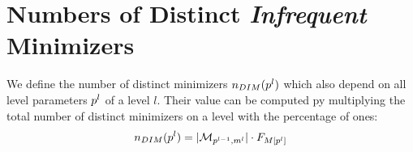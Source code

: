 \documentclass[a4paper,titlepage,onecolumn,oneside,12pt,nenglish,titlepage=firstiscover]{scrbook}
\theoremstyle{plain} %
\theoremstyle{definition} %
\theoremstyle{remark} %
\theoremstyle{plain}
\newcommand{\level}{l}
\begin{document}
\section{Numbers of Distinct \textit{Infrequent} Minimizers} \label{sec:nDIM}
\newcommand{\numberOfDistinctMinimizers}[1]{n_{DIM}(#1)}
\newcommand{\varNumberOfDistinctMinimizers}{\textbf{n}_{\textbf{DIM}}}
We define the number of distinct \infrequent minimizers $\numberOfDistinctMinimizers{\levelParameters{\level}}$ which also depend on all level parameters $\levelParameters{\level}$ of a level $\level$.  Their value can be computed py multiplying the total number of distinct minimizers on a level with the percentage of \infrequent ones:
\begin{equation}
	\numberOfDistinctMinimizers{\levelParameters{\level}} = |\distinctMinimizers{\level}| \cdot \CDF{\compactZV{M}{\levelParameters{\level}}}
\end{equation}
\end{document}
